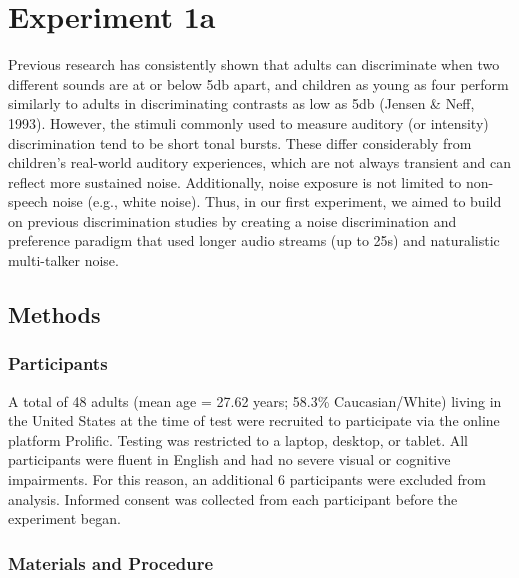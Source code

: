 \documentclass[10pt, letterpaper]{article}
\begin{document}
\hypertarget{experiment-1a}{%
\section{Experiment 1a}\label{experiment-1a}}

Previous research has consistently shown that adults can discriminate
when two different sounds are at or below 5db apart, and children as
young as four perform similarly to adults in discriminating contrasts as
low as 5db (Jensen \& Neff, 1993). However, the stimuli commonly used to
measure auditory (or intensity) discrimination tend to be short tonal
bursts. These differ considerably from children's real-world auditory
experiences, which are not always transient and can reflect more
sustained noise. Additionally, noise exposure is not limited to
non-speech noise (e.g., white noise). Thus, in our first experiment, we
aimed to build on previous discrimination studies by creating a noise
discrimination and preference paradigm that used longer audio streams
(up to 25s) and naturalistic multi-talker noise.

\hypertarget{methods}{%
\subsection{Methods}\label{methods}}

\hypertarget{participants}{%
\subsubsection{Participants}\label{participants}}

A total of 48 adults (mean age = 27.62 years; 58.3\% Caucasian/White)
living in the United States at the time of test were recruited to
participate via the online platform Prolific. Testing was restricted to
a laptop, desktop, or tablet. All participants were fluent in English
and had no severe visual or cognitive impairments. For this reason, an
additional 6 participants were excluded from analysis. Informed consent
was collected from each participant before the experiment began.

\hypertarget{materials-and-procedure}{%
\subsubsection{Materials and Procedure}\label{materials-and-procedure}}
\end{document}

